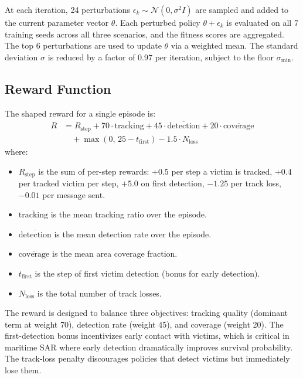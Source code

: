 \documentclass[journal]{IEEEtran}
\begin{document}
At each iteration, 24 perturbations $\epsilon_k \sim \mathcal{N}(0, \sigma^2 I)$ are
sampled and added to the current parameter vector $\theta$. Each perturbed policy
$\theta + \epsilon_k$ is evaluated on all 7 training seeds across all three scenarios,
and the fitness scores are aggregated. The top 6 perturbations are used to update
$\theta$ via a weighted mean. The standard deviation $\sigma$ is reduced by a factor
of 0.97 per iteration, subject to the floor $\sigma_{\min}$.

\subsection{Reward Function}

The shaped reward for a single episode is:
\begin{align}
  R &= R_{\text{step}} + 70 \cdot \overline{\text{tracking}} + 45 \cdot \overline{\text{detection}}
      + 20 \cdot \overline{\text{coverage}} \nonumber \\
    &\quad + \max(0,\, 25 - t_{\text{first}}) - 1.5 \cdot N_{\text{loss}}
  \label{eq:reward}
\end{align}
where:
\begin{itemize}
  \item $R_{\text{step}}$ is the sum of per-step rewards: $+0.5$ per step a victim
        is tracked, $+0.4$ per tracked victim per step, $+5.0$ on first detection,
        $-1.25$ per track loss, $-0.01$ per message sent.
  \item $\overline{\text{tracking}}$ is the mean tracking ratio over the episode.
  \item $\overline{\text{detection}}$ is the mean detection rate over the episode.
  \item $\overline{\text{coverage}}$ is the mean area coverage fraction.
  \item $t_{\text{first}}$ is the step of first victim detection (bonus for early detection).
  \item $N_{\text{loss}}$ is the total number of track losses.
\end{itemize}

The reward is designed to balance three objectives: tracking quality (dominant term
at weight 70), detection rate (weight 45), and coverage (weight 20). The first-detection
bonus incentivizes early contact with victims, which is critical in maritime SAR where
early detection dramatically improves survival probability. The track-loss penalty
discourages policies that detect victims but immediately lose them.
\end{document}

